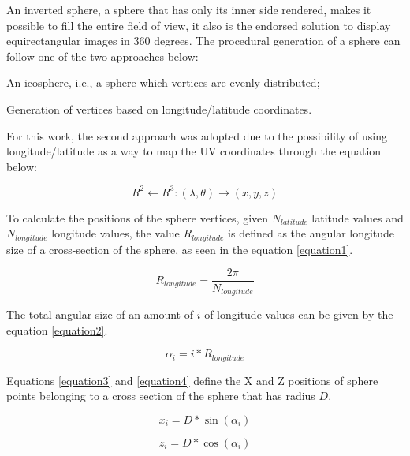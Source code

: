 \documentclass[runningheads]{llncs}
\begin{document}
An inverted sphere, a sphere that has only its inner side rendered, makes it possible to fill the entire field of view, it also is the endorsed solution to display equirectangular images in 360 degrees. The procedural generation of a sphere can follow one of the two approaches below:

\begin{enumerate}
  \begin{item} An icosphere, i.e., a sphere which vertices are evenly distributed;
 \end{item}
  \begin{item} Generation of vertices based on longitude/latitude coordinates. \end{item}
\end{enumerate}

For this work, the second approach was adopted due to the possibility of using longitude/latitude as a way to map the UV coordinates through the equation below:

\begin{equation}
R^2 \leftarrow R^3 : (\lambda, \theta) \rightarrow (x, y, z)
\label{equation1}
\end{equation}

To calculate the positions of the sphere vertices, given $N_{latitude}$ latitude values  and $N_{longitude}$ longitude values, the value $R_{longitude}$ is defined as the angular longitude size of a cross-section of the sphere, as seen in the equation \ref{equation1}.

\begin{equation}
R_{longitude} = \frac{2 \pi}{N_{longitude}}
\label{equation1}
\end{equation}

The total angular size of an amount of $i$ of longitude values can be given by the equation \ref{equation2}.

\begin{equation}
\alpha_{i} = i * R_{longitude}
\label{equation2}
\end{equation}

Equations \ref{equation3} and \ref{equation4} define the X and Z positions of sphere points belonging to a cross section of the sphere that has radius $D$.

\begin{equation}
x_{i} = D * \sin(\alpha_{i})
\label{equation3}
\end{equation}

\begin{equation}
z_{i} = D * \cos(\alpha_{i})
\label{equation4}
\end{equation}
\end{document}
